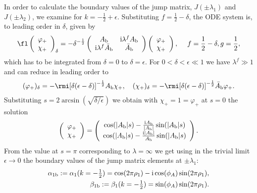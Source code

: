 \documentclass[12pt]{iopart}
\begin{document}
In order to calculate the boundary values of the jump matrix, $J(\pm\lambda_1)$ and $J(\pm\lambda_2)$, we examine  for $k=-\frac12+\epsilon$. Substituting $f=\frac12-\delta$, the ODE system is, to leading order in $\delta$, given by
\begin{eqnarray}
\fl \left(\begin{array}{cc} \varphi_+ \\ \chi_+ \end{array}\right)_\delta = -\delta^{-\frac12}\left(\begin{array}{cc} A_{\rm b} & {\rm i}\lambda^f A_{\rm b} \\ {\rm i}\lambda^f \bar{A}_{\rm b} & \bar{A}_{\rm b} \end{array}\right) \left(\begin{array}{cc} \varphi_+ \\ \chi_+ \end{array}\right), \quad\; f=\frac12-\delta,g=\frac12, \label{ODEdelta}
\end{eqnarray}
which has to be integrated from $\delta=0$ to $\delta=\epsilon$. For $0<\delta<\epsilon\ll 1$ we have $\lambda^f\gg1$ and can reduce  in leading order to 
\begin{eqnarray}
(\varphi_+)_\delta=-\rmi [\delta(\epsilon-\delta)]^{-\frac12}A_{\rm b} \chi_+,\quad
(\chi_+)_\delta=-\rmi [\delta(\epsilon-\delta)]^{-\frac12}\bar{A}_{\rm b} \varphi_+.
\end{eqnarray}
Substituting $s=2 \arcsin(\sqrt{\delta/\epsilon})$ we obtain with $\chi_+=1=\varphi_+$ at $s=0$ the solution
\begin{eqnarray}
\left(\begin{array}{cc} \varphi_+ \\ \chi_+ \end{array}\right)=\left(\begin{array}{cc} \cos (|A_{\rm b}|s)-\frac{{\rm i} A_{\rm b}}{|A_{\rm b}|} \sin (|A_{\rm b}|s) \\  \cos (|A_{\rm b}|s)-\frac{{\rm i} |A_{\rm b}|}{A_{\rm b}} \sin (|A_{\rm b}|s) \end{array}\right).
\end{eqnarray}
From the value at $s=\pi$ corresponding to $\lambda=\infty$ we get using  in the trivial limit $\epsilon\to 0$ the boundary values of the jump matrix elements at $\pm\lambda_1$:
\begin{eqnarray}
\alpha_{1{\rm b}}:=\alpha_{1}(k=-\mbox{$\frac12$}) = \cos (2\pi \rho_1)-{\rm i} \cos(\phi_A) \sin (2 \pi  \rho_1), \label{alpha1R}\\
\beta_{1{\rm b}}:=\beta_{1}(k=-\mbox{$\frac12$}) = \sin(\phi_A) \sin (2 \pi \rho_1).  \label{alphabeta1R}
\end{eqnarray}
\end{document}
